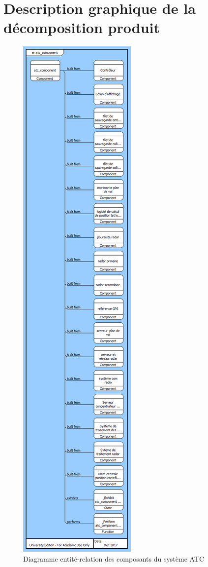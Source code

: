 
\section{Description graphique de la décomposition produit }


	\begin{figure}[H]
	\begin{center}	
		\includegraphics[scale=0.50]{images/atc_component}
		\caption{Diagramme entité-relation des composants du système ATC}
		\label{prod}
	\end{center}
\end{figure}


